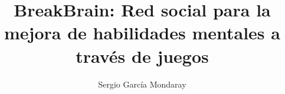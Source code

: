 
\title{BreakBrain: Red social para la mejora de habilidades mentales a través de juegos}
\author{Sergio García Mondaray}{}







